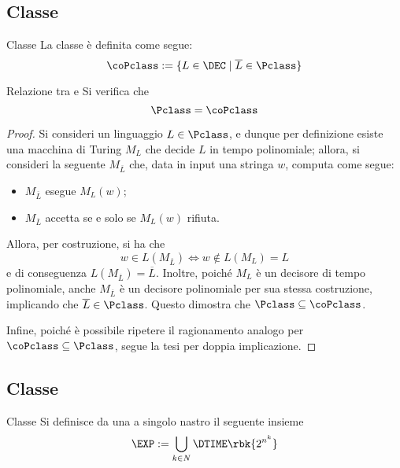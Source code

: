 \documentclass[a4paper, 12pt]{report}
\begin{document}
    \subsection{Classe \coPclass}
    
    \begin{frameddefn}{Classe \coPclass}
        La classe \coPclass è definita come segue: $$\coPclass := \{ L \in \DEC \mid \overline L \in \Pclass \}$$
    \end{frameddefn}

    \begin{framedthm}[label={p = cop}]{Relazione tra \Pclass e \coPclass}
        Si verifica che $$\Pclass = \coPclass$$
    \end{framedthm}

    \begin{proof}
        Si consideri un linguaggio $L \in \Pclass$, e dunque per definizione esiste una macchina di Turing $M_L$ che decide $L$ in tempo polinomiale; allora, si consideri la seguente \TM $M_{\overline L}$ che, data in input una stringa $w$, computa come segue:

        \begin{itemize}
            \item $M_{\overline L}$ esegue $M_L(w)$;
            \item $M_{\overline L}$ accetta se e solo se $M_L(w)$ rifiuta.
        \end{itemize}

        Allora, per costruzione, si ha che $$w \in L(M_{\overline L}) \iff w \notin L(M_L) = L$$ e di conseguenza $L(M_{\overline L}) = \overline L$. Inoltre, poiché $M_L$ è un decisore di tempo polinomiale, anche $M_{\overline L}$ è un decisore polinomiale per sua stessa costruzione, implicando che $\overline L \in \Pclass$. Questo dimostra che $\Pclass \subseteq \coPclass$.

        Infine, poiché è possibile ripetere il ragionamento analogo per $\coPclass \subseteq \Pclass$, segue la tesi per doppia implicazione.
    \end{proof}

    \subsection{Classe \EXP}

    \begin{frameddefn}{Classe \EXP}
        Si definisce  da una \TM a singolo nastro il seguente insieme $$\EXP := \bigcup_{k \in N}{\DTIME \rbk{2^{n^k}}}$$
    \end{frameddefn}
\end{document}
